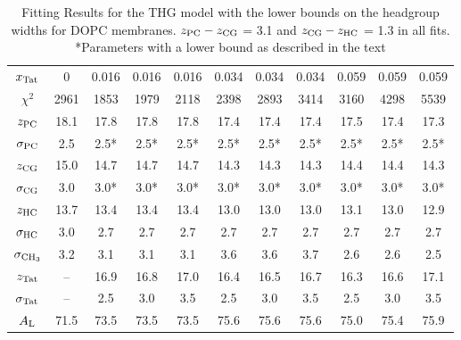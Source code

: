 \begin{table}[htbp]
  \centering
  \begin{tabular}{c|c|ccc|ccc|ccc}
  \hline 
    $x_\textrm{Tat}$ & 0  &    0.016 & 0.016 & 0.016 & 0.034 & 0.034 & 0.034 & 0.059 & 0.059 & 0.059 \\
    $\chi^2$ & 2961 &    1853 & 1979 & 2118 & 2398 & 2893 & 3414    & 3160 & 4298 & 5539 \\   
    $z_\textrm{PC}$ & 18.1   &    17.8 & 17.8 & 17.8 & 17.4 & 17.4 & 17.4    & 17.5 & 17.4 & 17.3 \\   
    $\sigma_\textrm{PC}$  & 2.5 &   2.5* &  2.5* &  2.5* & 2.5* & 2.5* & 2.5*       & 2.5* & 2.5* & 2.5* \\      
    $z_\textrm{CG}$   & 15.0 &    14.7 & 14.7 & 14.7 & 14.3 & 14.3 & 14.3    & 14.4 & 14.4 & 14.3 \\   
    $\sigma_\textrm{CG}$ & 3.0 &    3.0* &  3.0* &  3.0* & 3.0* & 3.0* & 3.0* & 3.0* & 3.0* & 3.0* \\      
    $z_\textrm{HC}$ & 13.7 &     13.4 & 13.4 & 13.4  & 13.0 & 13.0 & 13.0    & 13.1 & 13.0 & 12.9 \\   
    $\sigma_\textrm{HC}$ &      3.0 &2.7 & 2.7 & 2.7  & 2.7 & 2.7 & 2.7       & 2.7 & 2.7 & 2.7 \\      
    $\sigma_{\textrm{CH}_3}$ & 3.2 & 3.1 & 3.1 & 3.1 & 3.6 & 3.6 & 3.7       & 2.6 & 2.6 & 2.5 \\      
    $z_\textrm{Tat}$ & -- &          16.9 & 16.8 & 17.0 & 16.4 & 16.5 & 16.7    & 16.3 & 16.6 & 17.1 \\   
    $\sigma_\textrm{Tat}$ & -- &         2.5 & 3.0 & 3.5 & 2.5 & 3.0 & 3.5       & 2.5 & 3.0 & 3.5 \\      
    $A_\textrm{L}$ & 71.5 &       73.5 & 73.5 & 73.5 & 75.6 & 75.6 & 75.6    & 75.0 & 75.4 & 75.9 \\    
  \hline
  \end{tabular}
  \caption{Fitting Results for the THG model with the lower bounds on the headgroup
  widths for DOPC membranes. 
  $z_\textrm{PC}-z_\textrm{CG}$ = 3.1 and $z_\textrm{CG}-z_\textrm{HC}$ = 1.3 in all fits. \\
  *Parameters with a lower bound as described in the text}
  \label{tab:bound_DOPC}
\end{table}

